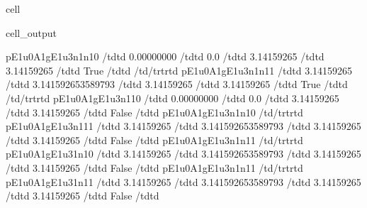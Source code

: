 \documentclass[letterpaper,table,10pt,english]{jupyterBook}
\begin{document}
\begin{sphinxuseclass}{cell}
\begin{sphinxVerbatimOutput}
\begin{sphinxuseclass}{cell_output}
\begin{sphinxVerbatim}[commandchars=\\\{\}]
p\PYGZus{}E1u\PYGZus{}0\PYGZus{}A1g\PYGZus{}E1u\PYGZus{}3\PYGZus{}n1\PYGZus{}n1\PYGZus{}0 \PYGZlt{}/td\PYGZgt{}\PYGZlt{}td\PYGZgt{}  0.00000000 \PYGZlt{}/td\PYGZgt{}\PYGZlt{}td\PYGZgt{} 0.0 \PYGZlt{}/td\PYGZgt{}\PYGZlt{}td\PYGZgt{} \PYGZhy{}3.14159265 \PYGZlt{}/td\PYGZgt{}\PYGZlt{}td\PYGZgt{}  3.14159265 \PYGZlt{}/td\PYGZgt{}\PYGZlt{}td\PYGZgt{} True \PYGZlt{}/td\PYGZgt{}\PYGZlt{}td\PYGZgt{}  \PYGZlt{}/td\PYGZgt{}\PYGZlt{}/tr\PYGZgt{}\PYGZlt{}tr\PYGZgt{}\PYGZlt{}td\PYGZgt{} p\PYGZus{}E1u\PYGZus{}0\PYGZus{}A1g\PYGZus{}E1u\PYGZus{}3\PYGZus{}n1\PYGZus{}n1\PYGZus{}1 \PYGZlt{}/td\PYGZgt{}\PYGZlt{}td\PYGZgt{}  3.14159265 \PYGZlt{}/td\PYGZgt{}\PYGZlt{}td\PYGZgt{} 3.141592653589793 \PYGZlt{}/td\PYGZgt{}\PYGZlt{}td\PYGZgt{} \PYGZhy{}3.14159265 \PYGZlt{}/td\PYGZgt{}\PYGZlt{}td\PYGZgt{}  3.14159265 \PYGZlt{}/td\PYGZgt{}\PYGZlt{}td\PYGZgt{} True \PYGZlt{}/td\PYGZgt{}\PYGZlt{}td\PYGZgt{}  \PYGZlt{}/td\PYGZgt{}\PYGZlt{}/tr\PYGZgt{}\PYGZlt{}tr\PYGZgt{}\PYGZlt{}td\PYGZgt{} p\PYGZus{}E1u\PYGZus{}0\PYGZus{}A1g\PYGZus{}E1u\PYGZus{}3\PYGZus{}n1\PYGZus{}1\PYGZus{}0 \PYGZlt{}/td\PYGZgt{}\PYGZlt{}td\PYGZgt{}  0.00000000 \PYGZlt{}/td\PYGZgt{}\PYGZlt{}td\PYGZgt{} 0.0 \PYGZlt{}/td\PYGZgt{}\PYGZlt{}td\PYGZgt{} \PYGZhy{}3.14159265 \PYGZlt{}/td\PYGZgt{}\PYGZlt{}td\PYGZgt{}  3.14159265 \PYGZlt{}/td\PYGZgt{}\PYGZlt{}td\PYGZgt{} False \PYGZlt{}/td\PYGZgt{}\PYGZlt{}td\PYGZgt{} p\PYGZus{}E1u\PYGZus{}0\PYGZus{}A1g\PYGZus{}E1u\PYGZus{}3\PYGZus{}n1\PYGZus{}n1\PYGZus{}0 \PYGZlt{}/td\PYGZgt{}\PYGZlt{}/tr\PYGZgt{}\PYGZlt{}tr\PYGZgt{}\PYGZlt{}td\PYGZgt{} p\PYGZus{}E1u\PYGZus{}0\PYGZus{}A1g\PYGZus{}E1u\PYGZus{}3\PYGZus{}n1\PYGZus{}1\PYGZus{}1 \PYGZlt{}/td\PYGZgt{}\PYGZlt{}td\PYGZgt{}  3.14159265 \PYGZlt{}/td\PYGZgt{}\PYGZlt{}td\PYGZgt{} 3.141592653589793 \PYGZlt{}/td\PYGZgt{}\PYGZlt{}td\PYGZgt{} \PYGZhy{}3.14159265 \PYGZlt{}/td\PYGZgt{}\PYGZlt{}td\PYGZgt{}  3.14159265 \PYGZlt{}/td\PYGZgt{}\PYGZlt{}td\PYGZgt{} False \PYGZlt{}/td\PYGZgt{}\PYGZlt{}td\PYGZgt{} p\PYGZus{}E1u\PYGZus{}0\PYGZus{}A1g\PYGZus{}E1u\PYGZus{}3\PYGZus{}n1\PYGZus{}n1\PYGZus{}1 \PYGZlt{}/td\PYGZgt{}\PYGZlt{}/tr\PYGZgt{}\PYGZlt{}tr\PYGZgt{}\PYGZlt{}td\PYGZgt{} p\PYGZus{}E1u\PYGZus{}0\PYGZus{}A1g\PYGZus{}E1u\PYGZus{}3\PYGZus{}1\PYGZus{}n1\PYGZus{}0 \PYGZlt{}/td\PYGZgt{}\PYGZlt{}td\PYGZgt{}  3.14159265 \PYGZlt{}/td\PYGZgt{}\PYGZlt{}td\PYGZgt{} 3.141592653589793 \PYGZlt{}/td\PYGZgt{}\PYGZlt{}td\PYGZgt{} \PYGZhy{}3.14159265 \PYGZlt{}/td\PYGZgt{}\PYGZlt{}td\PYGZgt{}  3.14159265 \PYGZlt{}/td\PYGZgt{}\PYGZlt{}td\PYGZgt{} False \PYGZlt{}/td\PYGZgt{}\PYGZlt{}td\PYGZgt{} p\PYGZus{}E1u\PYGZus{}0\PYGZus{}A1g\PYGZus{}E1u\PYGZus{}3\PYGZus{}n1\PYGZus{}n1\PYGZus{}1 \PYGZlt{}/td\PYGZgt{}\PYGZlt{}/tr\PYGZgt{}\PYGZlt{}tr\PYGZgt{}\PYGZlt{}td\PYGZgt{} p\PYGZus{}E1u\PYGZus{}0\PYGZus{}A1g\PYGZus{}E1u\PYGZus{}3\PYGZus{}1\PYGZus{}n1\PYGZus{}1 \PYGZlt{}/td\PYGZgt{}\PYGZlt{}td\PYGZgt{}  3.14159265 \PYGZlt{}/td\PYGZgt{}\PYGZlt{}td\PYGZgt{} 3.141592653589793 \PYGZlt{}/td\PYGZgt{}\PYGZlt{}td\PYGZgt{} \PYGZhy{}3.14159265 \PYGZlt{}/td\PYGZgt{}\PYGZlt{}td\PYGZgt{}  3.14159265 \PYGZlt{}/td\PYGZgt{}\PYGZlt{}td\PYGZgt{} False \PYGZlt{}/td\PYGZgt{}\PYGZlt{}td\PYGZgt{} 
\end{sphinxVerbatim}
\end{sphinxuseclass}
\end{sphinxVerbatimOutput}
\end{sphinxuseclass}
\end{document}

